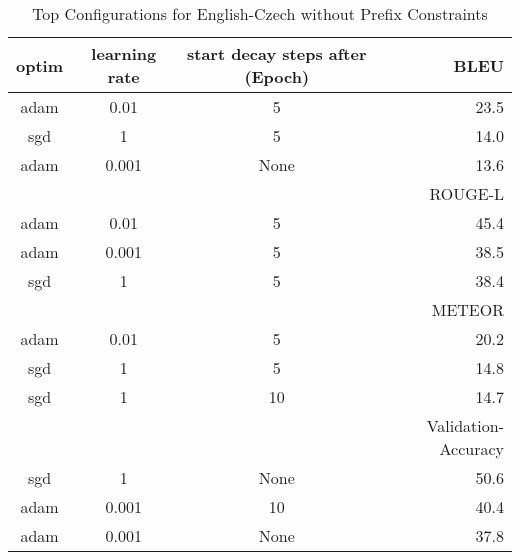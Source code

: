 \begin{table}
	\caption{Top Configurations for English-Czech without Prefix Constraints}
	\label{tab:optim_clean-cs-en}
	\centering
\begin{tabular}{|c|c|c|r|}
	\hline
	optim   & learning rate & start decay steps after (Epoch)  & BLEU\\
	\hline
	adam &      0.01   &       5      & 23.5 \\
	sgd  &       1     &       5      & 14.0 \\
	adam &     0.001   &       None      & 13.6 \\
	\hline
	\hline
	& & & ROUGE-L \\
	\hline
	adam &      0.01   &  5 & 45.4 \\
	adam &     0.001   &  5 & 38.5 \\
	sgd  &       1     &  5 & 38.4 \\
	\hline
	\hline
	& & & METEOR \\
	\hline
	adam &0.01 & 5 & 20.2 \\
	sgd  & 1   & 5 & 14.8 \\
	sgd  & 1   & 10 & 14.7 \\
	\hline
	\hline
	& & & Validation-Accuracy \\
	\hline
	sgd  &       1   & None & 50.6\\
	adam &     0.001 & 10 & 40.4\\
	adam &     0.001 & None & 37.8\\
	\hline
\end{tabular}
\end{table}
